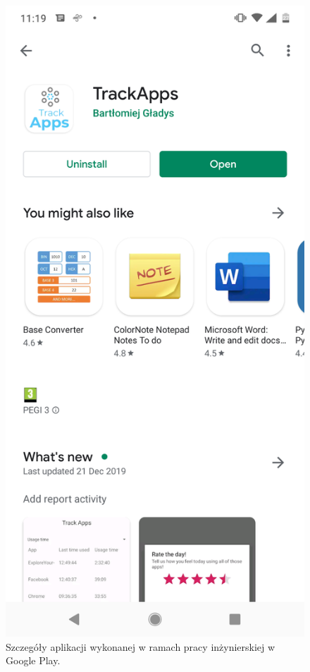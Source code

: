 \documentclass[a4paper,twoside,12pt]{book}
\begin{document}
\begin{figure}[h!]
    \centering
    \includegraphics[scale=0.2]{images/google_play_screen.png}
    \caption{Szczegóły aplikacji wykonanej w ramach pracy inżynierskiej w Google Play.}
    \label{fig:google_play_screen}
\end{figure}
\end{document}
